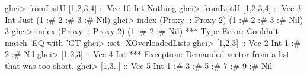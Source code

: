 \documentclass[]{article}
\newenvironment{Shaded}{}{}
\newcommand{\DataTypeTok}[1]{\textcolor[rgb]{0.56,0.13,0.00}{#1}}
\newcommand{\DecValTok}[1]{\textcolor[rgb]{0.25,0.63,0.44}{#1}}
\newcommand{\CharTok}[1]{\textcolor[rgb]{0.25,0.44,0.63}{#1}}
\newcommand{\OtherTok}[1]{\textcolor[rgb]{0.00,0.44,0.13}{#1}}
\newcommand{\FunctionTok}[1]{\textcolor[rgb]{0.02,0.16,0.49}{#1}}
\newcommand{\NormalTok}[1]{#1}
\begin{document}
\begin{Shaded}
\begin{Highlighting}[]
\NormalTok{ghci}\FunctionTok{>}\NormalTok{ fromListU [}\DecValTok{1}\NormalTok{,}\DecValTok{2}\NormalTok{,}\DecValTok{3}\NormalTok{,}\DecValTok{4}\NormalTok{]}\OtherTok{ ::} \DataTypeTok{Vec} \DecValTok{10} \DataTypeTok{Int}
\DataTypeTok{Nothing}
\NormalTok{ghci}\FunctionTok{>}\NormalTok{ fromListU [}\DecValTok{1}\NormalTok{,}\DecValTok{2}\NormalTok{,}\DecValTok{3}\NormalTok{,}\DecValTok{4}\NormalTok{]}\OtherTok{ ::} \DataTypeTok{Vec} \DecValTok{3} \DataTypeTok{Int}
\DataTypeTok{Just}\NormalTok{ (}\DecValTok{1} \FunctionTok{:#} \DecValTok{2} \FunctionTok{:#} \DecValTok{3} \FunctionTok{:#} \DataTypeTok{Nil}\NormalTok{)}
\NormalTok{ghci}\FunctionTok{>}\NormalTok{ index (}\DataTypeTok{Proxy}\OtherTok{ ::} \DataTypeTok{Proxy} \DecValTok{2}\NormalTok{) (}\DecValTok{1} \FunctionTok{:#} \DecValTok{2} \FunctionTok{:#} \DecValTok{3} \FunctionTok{:#} \DataTypeTok{Nil}\NormalTok{)}
\DecValTok{3}
\NormalTok{ghci}\FunctionTok{>}\NormalTok{ index (}\DataTypeTok{Proxy}\OtherTok{ ::} \DataTypeTok{Proxy} \DecValTok{2}\NormalTok{) (}\DecValTok{1} \FunctionTok{:#} \DecValTok{2} \FunctionTok{:#} \DataTypeTok{Nil}\NormalTok{)}
\FunctionTok{***} \DataTypeTok{Type} \DataTypeTok{Error}\FunctionTok{:} \DataTypeTok{Couldn't}\NormalTok{ match }\CharTok{'EQ with '}\DataTypeTok{GT}
\NormalTok{ghci}\FunctionTok{>} \FunctionTok{:}\NormalTok{set }\FunctionTok{-}\DataTypeTok{XOverloadedLists}
\NormalTok{ghci}\FunctionTok{>}\NormalTok{ [}\DecValTok{1}\NormalTok{,}\DecValTok{2}\NormalTok{,}\DecValTok{3}\NormalTok{]}\OtherTok{ ::} \DataTypeTok{Vec} \DecValTok{2} \DataTypeTok{Int}
\DecValTok{1} \FunctionTok{:#} \DecValTok{2} \FunctionTok{:#} \DataTypeTok{Nil}
\NormalTok{ghci}\FunctionTok{>}\NormalTok{ [}\DecValTok{1}\NormalTok{,}\DecValTok{2}\NormalTok{,}\DecValTok{3}\NormalTok{]}\OtherTok{ ::} \DataTypeTok{Vec} \DecValTok{4} \DataTypeTok{Int}
\FunctionTok{***} \DataTypeTok{Exception}\FunctionTok{:} \DataTypeTok{Demanded}\NormalTok{ vector from a list that was too short}\FunctionTok{.}
\NormalTok{ghci}\FunctionTok{>}\NormalTok{ [}\DecValTok{1}\NormalTok{,}\DecValTok{3}\FunctionTok{..}\NormalTok{]}\OtherTok{ ::} \DataTypeTok{Vec} \DecValTok{5} \DataTypeTok{Int}
\DecValTok{1} \FunctionTok{:#} \DecValTok{3} \FunctionTok{:#} \DecValTok{5} \FunctionTok{:#} \DecValTok{7} \FunctionTok{:#} \DecValTok{9} \FunctionTok{:#} \DataTypeTok{Nil}
\end{Highlighting}
\end{Shaded}
\end{document}
